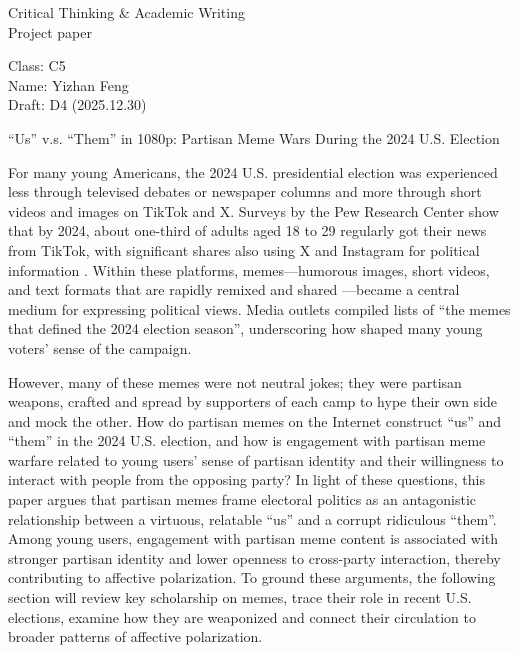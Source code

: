 \documentclass[12pt,twoside]{article}
\begin{document}
{\fontsize{16}{35}\selectfont
Critical Thinking \& Academic Writing\\
Project paper\par
}

\vspace{-0.5\baselineskip}

Class: C5 \\
Name: Yizhan Feng \\
Draft: D4 (2025.12.30) \\

\vspace{-0.75\baselineskip}

\begin{center}
{\fontsize{14}{17}\selectfont
``Us'' v.s. ``Them'' in 1080p: Partisan Meme Wars During the 2024 U.S. Election\par
}
\end{center}

\vspace{-\baselineskip}


For many young Americans, the 2024 U.S. presidential election was experienced less through televised debates or newspaper columns and more through short videos and images on TikTok and X. Surveys by the Pew Research Center show that by 2024, about one-third of adults aged 18 to 29 regularly got their news from TikTok, with significant shares also using X and Instagram for political information \parencite{shearer2024newsTikTokXFacebookInstagram}. Within these platforms, memes---humorous images, short videos, and text formats that are rapidly remixed and shared \parencite[39]{shifman2013memesdigitalculture}---became a central medium for expressing political views. Media outlets compiled lists of ``the memes that defined the 2024 election season'', underscoring how shaped many young voters’ sense of the campaign.

However, many of these memes were not neutral jokes; they were partisan weapons, crafted and spread by supporters of each camp to hype their own side and mock the other. How do partisan memes on the Internet construct ``us'' and ``them'' in the 2024 U.S. election, and how is engagement with partisan meme warfare related to young users' sense of partisan identity and their willingness to interact with people from the opposing party? In light of these questions, this paper argues that partisan memes frame electoral politics as an antagonistic relationship between a virtuous, relatable ``us'' and a corrupt\added{,} ridiculous ``them''. Among young users, engagement with partisan meme content is associated with stronger partisan identity and lower openness to cross-party interaction, thereby contributing to affective polarization. To ground these arguments, the following section will review key scholarship on memes, trace their role in recent U.S. elections, examine how they are weaponized and connect their circulation to broader patterns of affective polarization.
\end{document}

